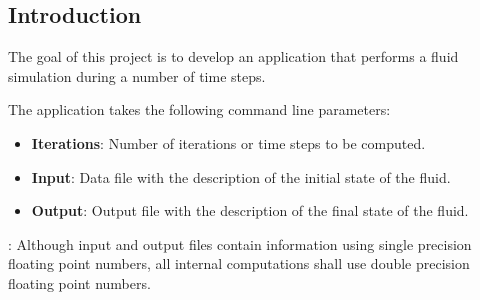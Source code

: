 \subsection{Introduction}

The goal of this project is to develop an application that performs a fluid
simulation during a number of time steps.

The application takes the following command line parameters:
\begin{itemize}
\item \textbf{Iterations}: Number of iterations or time steps to be computed.
\item \textbf{Input}: Data file with the description of the initial state of the
fluid.
\item \textbf{Output}: Output file with the description of the final state of
the fluid.
\end{itemize}

: Although input and output files contain information using
single precision floating point numbers, all internal computations shall use
double precision floating point numbers.
